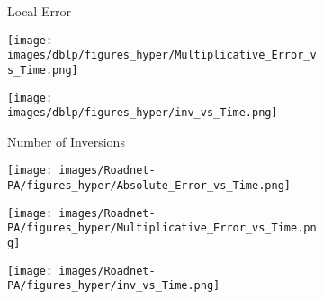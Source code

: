 \begin{figure*}[htbp]
\begin{subfigure}[b]{\textwidth}
\begin{minipage}[b]{0.3\textwidth}
	\end{minipage}%
	\begin{minipage}[b]{0.3\textwidth}
		\centering
		\caption*{Local Error} %
		\texttt{[image: images/dblp/figures\_hyper/Multiplicative\_Error\_vs\_Time.png]} %
		
	\end{minipage}%
	\begin{minipage}[b]{0.3\textwidth}
		\centering
		\caption*{Number of Inversions} %
		\texttt{[image: images/dblp/figures\_hyper/inv\_vs\_Time.png]} %
	\end{minipage}
\end{subfigure}
	\begin{subfigure}[b]{\textwidth}
		\centering
		\begin{minipage}[b]{0.05\textwidth}
			\centering
		\end{minipage}%
		\begin{minipage}[b]{0.3\textwidth}
			\centering
			\texttt{[image: images/Roadnet-PA/figures\_hyper/Absolute\_Error\_vs\_Time.png]} %
			
		\end{minipage}%
		\begin{minipage}[b]{0.3\textwidth}
			\centering
			
			\texttt{[image: images/Roadnet-PA/figures\_hyper/Multiplicative\_Error\_vs\_Time.png]} %
			
		\end{minipage}%
		\begin{minipage}[b]{0.3\textwidth}
			\centering
			
			\texttt{[image: images/Roadnet-PA/figures\_hyper/inv\_vs\_Time.png]} %
		\end{minipage}
		

\end{subfigure}
\end{figure*}
